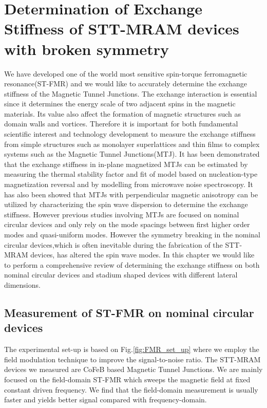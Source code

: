 \chapter{Determination of Exchange Stiffness of STT-MRAM devices with broken symmetry}

We have developed one of the world most sensitive spin-torque ferromagnetic resonance(ST-FMR)\cite{FieldMod} and we would like to accurately determine the exchange stiffness of the Magnetic Tunnel Junctions. The exchange interaction is essential since it determines the energy scale of two adjacent spins in the magnetic materials. Its value also affect the formation of magnetic structures such as domain walls and vortices. Therefore it is important for both fundamental scientific interest and technology development to measure the exchange stiffness from simple structures such as monolayer superlattices and thin films to complex systems such as the Magnetic Tunnel Junctions(MTJ). It has been demonstrated that the exchange stiffness in in-plane magnetized MTJs can be estimated by measuring the thermal stability factor and fit of model based on nucleation-type magnetization reversal\cite{thermalEx} and by modelling from microwave noise spectroscopy\cite{noiseEx}. It has also been showed that MTJs with perpendicular magnetic anisotropy can be utilized by characterizing the spin wave dispersion to determine the exchange stiffness\cite{chris}\cite{PMAEX}. However previous studies involving MTJs are focused on nominal circular devices and only rely on the mode spacings between first higher order modes and quasi-uniform modes. However the symmetry breaking in the nominal circular devices\cite{excitation2},which is often inevitable during the fabrication of the STT-MRAM devices, has altered the spin wave modes. In this chapter we would like to perform a comprehensive review of determining the exchange stiffness on both nominal circular devices and stadium shaped devices with different lateral dimensions.

\section{Measurement of ST-FMR on nominal circular devices}

The experimental set-up is based on Fig.\ref{fig:FMR_set_up} where we employ the field modulation technique to improve the signal-to-noise ratio. The STT-MRAM devices we measured are CoFeB based Magnetic Tunnel Junctions. We are mainly focused on the field-domain ST-FMR which sweeps the magnetic field at fixed constant driven frequency. We find that the field-domain measurement is usually faster and yields better signal compared with frequency-domain. 

